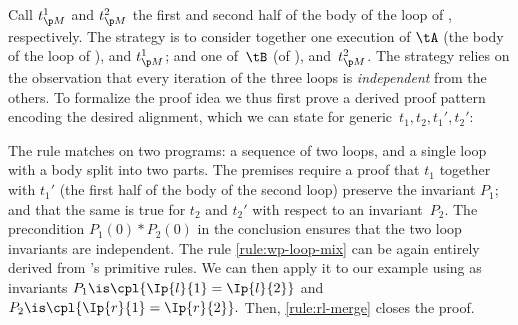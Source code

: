 Call $\tBet{1}$ and $\tBet{2}$ the first and second half of the body of the loop
of , respectively.
The strategy
is to consider together one execution of $\tA$
(the body of the loop of ),
and $\tBet{1}$;
and one of~$\tB$ (of ),
and~$\tBet{2}$.
The strategy relies on the observation that every iteration of the three loops
is \emph{independent} from the others.
To formalize the proof idea we thus first prove a derived proof pattern
encoding the desired alignment, which we can state for generic~$t_1,t_2,t_1',t_2'$:
\begin{proofrule}
     \label{rule:wp-loop-mix}
\end{proofrule}
The rule matches on two programs: a sequence of two loops,
and a single loop with a body split into two parts.
The premises require a proof that $t_1$ together with $t_1'$ (the first half of the body of the second loop) preserve the invariant $P_1$;
and that the same is true for $t_2$ and $t_2'$ with respect to an invariant~$P_2$.
The precondition $P_1(0)*P_2(0)$ in the conclusion ensures that the two
loop invariants are independent.
The rule \ref{rule:wp-loop-mix} can be again entirely derived
from \thelogic's primitive rules.
We can then apply it to our example
using as invariants
$
  P_1 \is \cpl{\Ip{l}{1} = \Ip{l}{2}}
$ and $
  P_2 \is \cpl{\Ip{r}{1} = \Ip{r}{2}}.
$
Then, \ref{rule:rl-merge} closes the proof.

\endgroup 
